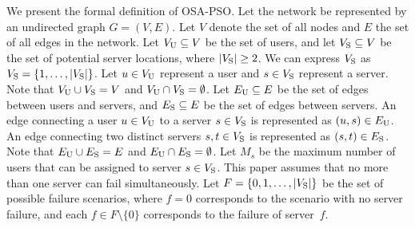 \documentclass[conference]{IEEEtran}
\begin{document}
\begin{CJK}{UTF8}{ipxm}
We present the formal definition of OSA-PSO. Let the network be represented by an undirected graph $G = (V, E)$.
Let $V$ denote the set of all nodes and $E$ the set of all edges in the network.
Let $V_{\rm{U}} \subseteq V$ be the set of users, and let $V_{\rm{S}} \subseteq V$ be the set of potential server locations, where $|V_{\rm{S}}| \geq 2$.
We can express $V_{\rm{S}}$ as $V_{\rm{S}} = \{1, \ldots, |V_{\rm{S}}|\}$.
Let $u \in V_{\rm{U}}$ represent a user and $s \in V_{\rm{S}}$ represent a server.
Note that $V_{\rm{U}} \cup V_{\rm{S}} = V$ and $V_{\rm{U}} \cap V_{\rm{S}} = \emptyset$.
Let $E_{\rm{U}} \subseteq E$ be the set of edges between users and servers, and $E_{\rm{S}} \subseteq E$ be the set of edges between servers.
An edge connecting a user $u \in V_{\rm{U}}$ to a server $s \in V_{\rm{S}}$ is represented as $(u,s) \in E_{\rm{U}}$.
An edge connecting two distinct servers $s, t \in V_{\rm{S}}$ is represented as $(s, t) \in E_{\rm{S}}$.
Note that $E_{\rm U} \cup E_{\rm S} =E$ and $E_{\rm{U}} \cap E_{\rm{S}} = \emptyset$.
Let $M_s$ be the maximum number of users that can be assigned to server $s \in V_{\rm{S}}$.
This paper assumes that no more than one server can fail simultaneously.
Let $F = \{0, 1, \ldots, |V_{\rm{S}}|\}$ be the set of possible failure scenarios, where $f = 0$ corresponds to the scenario with no server failure, and each $f \in F \setminus \{0\}$ corresponds to the failure of server~$f$.


\end{CJK}
\end{document}
